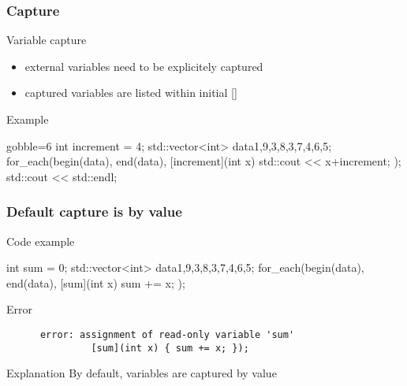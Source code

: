 \begin{frame}[fragile]
  \frametitle{Capture}
  \begin{block}{Variable capture}
    \begin{itemize}
    \item external variables need to be explicitely captured
    \item captured variables are listed within initial []
    \end{itemize}
  \end{block}
  \pause
  \begin{exampleblock}{Example}
    \begin{cppcode*}{gobble=6}
      int increment = 4;
      std::vector<int> data{1,9,3,8,3,7,4,6,5};
      for_each(begin(data), end(data),
               [increment](int x) {
                 std::cout << x+increment;
               });
      std::cout << std::endl;
    \end{cppcode*}
  \end{exampleblock}
\end{frame}

\begin{frame}[fragile]
  \frametitle{Default capture is by value}
  \begin{exampleblock}{Code example}
    \begin{cppcode}
      int sum = 0;
      std::vector<int> data{1,9,3,8,3,7,4,6,5};
      for_each(begin(data), end(data),
              [sum](int x) { sum += x; });
    \end{cppcode}
  \end{exampleblock}
  \pause
  \begin{alertblock}{Error}
    \begin{verbatim}
      error: assignment of read-only variable 'sum'
               [sum](int x) { sum += x; });
    \end{verbatim}
  \end{alertblock}
  \pause
  \begin{block}{Explanation}
    By default, variables are captured by value
  \end{block}
\end{frame}

